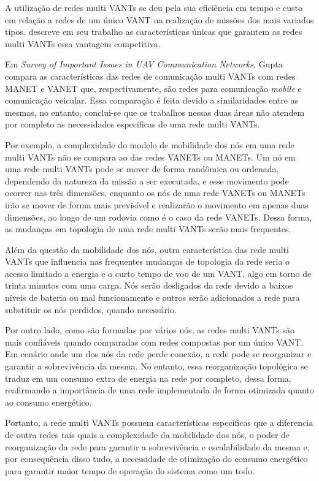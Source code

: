 \label{Cap:Requisitos}

A utilização de redes multi VANTs se deu pela sua eficiência em tempo e custo em relação a redes de um único VANT na realização de missões dos mais variados tipos. \cite{gupta2015survey} descreve em seu trabalho as características únicas que garantem as redes multi VANTs essa vantagem competitiva.

Em \emph{Survey of Important Issues in UAV Communication Networks}, Gupta compara as características das redes de comunicação multi VANTs com redes MANET e VANET que, respectivamente, são redes para comunicação \emph{mobile} e comunicação veicular. Essa comparação é feita devido a similaridades entre as mesmas, no entanto, conclui-se que os trabalhos nessas duas áreas não atendem por completo as necessidades especificas de uma rede multi VANTs.

Por exemplo, a complexidade do modelo de mobilidade dos nós em uma rede multi VANTs não se compara ao das redes VANETs ou MANETs. Um nó em uma rede multi VANTs pode se mover de forma randômica ou ordenada, dependendo da natureza da missão a ser executada, e esse movimento pode ocorrer nas três dimensões, enquanto os nós de uma rede VANETs ou MANETs irão se mover de forma mais previsível e realizarão o movimento em apenas duas dimensões, ao longo de um rodovia como é o caso da rede VANETs. Dessa forma, as mudanças em topologia de uma rede multi VANTs serão mais frequentes.

Além da questão da mobilidade dos nós, outra característica das rede multi VANTs que influencia nas frequentes mudanças de topologia da rede seria o acesso limitado a energia e o curto tempo de voo de um VANT, algo em torno de trinta minutos com uma carga. Nós serão desligados da rede devido a baixos níveis de bateria ou mal funcionamento e outros serão adicionados a rede para substituir os nós perdidos, quando necessário.

Por outro lado, como são formadas por vários nós, as redes multi VANTs são mais confiáveis quando comparadas com redes compostas por um único VANT. Em cenário onde um dos nós da rede perde conexão, a rede pode se reorganizar e garantir a sobrevivência da mesma. No entanto, essa reorganização topológica se traduz em um consumo extra de energia na rede por completo, dessa forma, reafirmando a importância de uma rede implementada de forma otimizada quanto ao consumo energético. 

Portanto, a rede multi VANTs possuem características especificas que a diferencia de outra redes tais quais a complexidade da mobilidade dos nós, o poder de reorganização da rede para garantir a sobrevivência e escalabilidade da mesma e, por consequência disso tudo, a necessidade de otimização do consumo energético para garantir maior tempo de operação do sistema como um todo.